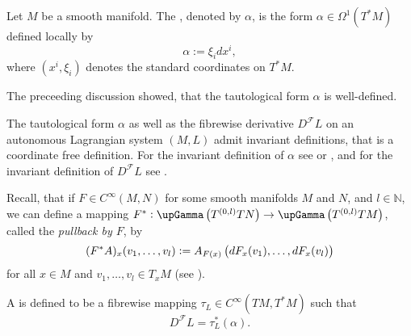 \begin{definition}
	\label{def:tautological_form}
	Let $M$ be a smooth manifold. The , denoted by $\alpha$, is the form  $\alpha \in \Omega^1(T^*M)$ defined locally by
	\begin{equation*}
		\alpha := \xi_idx^i,
	\end{equation*}
	\noindent where $(x^i,\xi_i)$ denotes the standard coordinates on $T^*M$.
\end{definition}

\begin{remark}
	The preceeding discussion showed, that the tautological form $\alpha$ is well-defined.
\end{remark}

\begin{remark}
	The tautological form $\alpha$ as well as the fibrewise derivative $D^\mathcal{F}L$ on an autonomous Lagrangian system $(M,L)$ admit invariant definitions, that is a coordinate free definition. For the invariant definition of $\alpha$ see \cite[569]{lee:smooth_manifolds:2013} or \cite[10--11]{silva:SG:2008}, and for the invariant definition of $D^\mathcal{F}L$ see \cite[31]{takhtajan:QM:2008}. 
\end{remark}

Recall, that if $F \in C^\infty(M,N)$ for some smooth manifolds $M$ and $N$, and $l \in \mathbb{N}$, we can define a mapping $F^* : \upGamma\del[1]{T^{(0,l)}TN} \to  \upGamma\del[1]{T^{(0,l)}TM}$, called the \emph{pullback by $F$}, by
\begin{equation*}
	(F^*A)_x(v_1,\dots,v_l) := A_{F(x)}\del[1]{dF_x(v_1),\dots,dF_x(v_l)}
\end{equation*}
\noindent for all $x \in M$ and $v_1,\dots,v_l \in T_xM$ (see \cite[320]{lee:smooth_manifolds:2013}).

\begin{definition}
	\label{def:Legendre_transform}
	A  is defined to be a fibrewise mapping $\tau_L \in C^\infty(TM,T^*M)$ such that
	\begin{equation*}
		D^\mathcal{F}L = \tau_L^*(\alpha).
	\end{equation*}
\end{definition}

